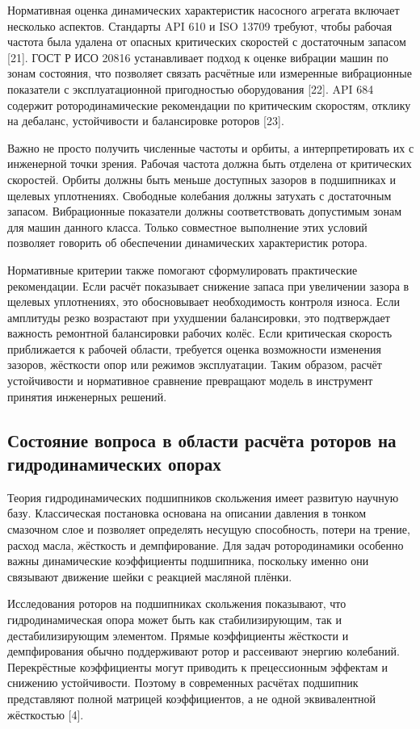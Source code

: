 Нормативная оценка динамических характеристик насосного агрегата включает несколько аспектов. Стандарты API 610 и ISO 13709 требуют, чтобы рабочая частота была удалена от опасных критических скоростей с достаточным запасом [21]. ГОСТ Р ИСО 20816 устанавливает подход к оценке вибрации машин по зонам состояния, что позволяет связать расчётные или измеренные вибрационные показатели с эксплуатационной пригодностью оборудования [22]. API 684 содержит ротородинамические рекомендации по критическим скоростям, отклику на дебаланс, устойчивости и балансировке роторов [23].

Важно не просто получить численные частоты и орбиты, а интерпретировать их с инженерной точки зрения. Рабочая частота должна быть отделена от критических скоростей. Орбиты должны быть меньше доступных зазоров в подшипниках и щелевых уплотнениях. Свободные колебания должны затухать с достаточным запасом. Вибрационные показатели должны соответствовать допустимым зонам для машин данного класса. Только совместное выполнение этих условий позволяет говорить об обеспечении динамических характеристик ротора.

Нормативные критерии также помогают сформулировать практические рекомендации. Если расчёт показывает снижение запаса при увеличении зазора в щелевых уплотнениях, это обосновывает необходимость контроля износа. Если амплитуды резко возрастают при ухудшении балансировки, это подтверждает важность ремонтной балансировки рабочих колёс. Если критическая скорость приближается к рабочей области, требуется оценка возможности изменения зазоров, жёсткости опор или режимов эксплуатации. Таким образом, расчёт устойчивости и нормативное сравнение превращают модель в инструмент принятия инженерных решений.

\subsection{Состояние вопроса в области расчёта роторов на гидродинамических опорах}

Теория гидродинамических подшипников скольжения имеет развитую научную базу. Классическая постановка основана на описании давления в тонком смазочном слое и позволяет определять несущую способность, потери на трение, расход масла, жёсткость и демпфирование. Для задач ротородинамики особенно важны динамические коэффициенты подшипника, поскольку именно они связывают движение шейки с реакцией масляной плёнки.

Исследования роторов на подшипниках скольжения показывают, что гидродинамическая опора может быть как стабилизирующим, так и дестабилизирующим элементом. Прямые коэффициенты жёсткости и демпфирования обычно поддерживают ротор и рассеивают энергию колебаний. Перекрёстные коэффициенты могут приводить к прецессионным эффектам и снижению устойчивости. Поэтому в современных расчётах подшипник представляют полной матрицей коэффициентов, а не одной эквивалентной жёсткостью [4].

